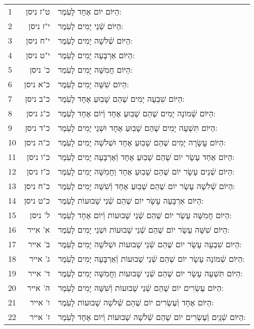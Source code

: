 \documentclass[twoside, openany, parskip=half, 11pt]{book}
\begin{document}
\begin{scriptsize}
\begin{longtable}{ l | r | p{} }
1 & ט"ז ניסן & הַיּוֹם יוֹם אֶחָד לָעֹֽמֶר: \\
2 & י"ז ניסן & הַיּוֹם שְֿׁנֵי יָמִים לָעֹֽמֶר: \\
3 & י"ח ניסן & הַיּוֹם שְֿׁלֹשָׁה יָמִים לָעֹֽמֶר: \\
4 & י"ט ניסן & הַיּוֹם אַרְבָּעָה יָמִים לָעֹֽמֶר: \\
5 & כ' ניסן & הַיּוֹם חֲמִשָּׁה יָמִים לָעֹֽמֵר: \\
6 & כ"א ניסן & הַיוֹם שִׁשָּׁה יָמִים לָעֹֽמֶר: \\
7 & כ"ב ניסן & הַיּוֹם שִׁבְעָה יָמִים שֶׁהֵם שָׁבֽוּעַ אֶחָד לָעֹֽמֶר: \\
8 & כ"ג ניסן & הַיּוֹם שְֿׁמוֹנָה יָמִים שֶׁהֵם שָׁבֽוּעַ אֶחָד וְֿיוֹם אֶחָד לָעֹֽמֶר: \\
9 & כ"ד ניסן & הַיּוֹם תִּשְׁעָה יָמִים שֶׁהֵם שָׁבֽוּעַ אֶחָד וּשְׁנֵי יָמִים לָעֹֽמֶר: \\
10 & כ"ה ניסן & הַיּוֹם עֲשָׂרָה יָמִים שֶׁהֵם שָׁבֽוּעַ אֶחָד וּשְׁלֹשָׁה יָמִים לָעֹֽמֶר: \\
11 & כ"ו ניסן & הַיּוֹם אַחַד עָשָׂר יוֹם שֶׁהֵם שָׁבֽוּעַ אֶחָד וְֿאַרְבָּעָה יָמִים לָעֹֽמֶר: \\
12 & כ"ז ניסן & הַיּוֹם שְֿׁנֵים עָשָׂר יוֹם שֶׁהֵם שָׁבֽוּעַ אֶחָד וַחֲמִשָּׁה יָמִים לָעֹֽמֶר: \\
13 & כ"ח ניסן & הַיּוֹם שְֿׁלֹשָׁה עָשָׂר יוֹם שֶׁהֵם שָׁבֽוּעַ אֶחָד וְֿשִׁשָּׁה יָמִים לָעֹֽמֶר: \\
14 & כ"ט ניסן & הַיּוֹם אַרְבָּעָה עָשָׂר יוֹם שֶׁהֵם שְֿׁנֵי שָׁבוּעוֹת לָעֹֽמֶר: \\
15 & ל' ניסן & הַיּוֹם חֲמִשָּׁה עָשָׂר יוֹם שֶׁהֵם שְֿׁנֵי שָׁבוּעוֹת וְֿיוֹם אֶחָד לָעֹֽמֶר: \\
16 & א' אייר & הַיּוֹם שִׁשָּׁה עָשָׂר יוֹם שֶׁהֵם שְֿׁנֵי שָׁבוּעוֹת וּשְׁנֵי יָמִים לָעֹֽמֶר: \\
17 & ב' אייר & הַיּוֹם שִׁבְעָה עָשָׂר יוֹם שֶׁהֵם שְֿׁנֵי שָׁבוּעוֹת וּשְׁלֹשָׁה יָמִים לָעֹֽמֶר: \\
18 & ג' אייר & הַיּוֹם שְֿׁמוֹנָה עָשָׂר יוֹם שֶׁהֵם שְֿׁנֵי שָׁבוּעוֹת וְֿאַרְבָּעָה יָמִים לָעֹֽמֶר: \\
19 & ד' אייר & הַיּוֹם תִּשְׁעָה עָשָׂר יוֹם שֶׁהֵם שְֿׁנֵי שָׁבוּעוֹת וַחֲמִשָּׁה יָמִים לָעֹֽמֶר: \\
20 & ה' אייר & הַיּוֹם עֶשְׂרִים יוֹם שֶׁהֵם שְֿׁנֵי שָׁבוּעוֹת וְֿשִׁשָּׁה יָמִים לָעֹֽמֶר: \\
21 & ו' אייר & הַיּוֹם אֶחָד וְֿעֶשְׂרִים יוֹם שֶׁהֵם שְֿׁלֹשָׁה שָׁבוּעוֹת לָעֹֽמֶר: \\
22 & ז' אייר & הַיּוֹם שְֿׁנַֽיִם וְֿעֶשְׂרִים יוֹם שֶׁהֵם שְֿׁלֹשָׁה שָׁבוּעוֹת וְֿיוֹם אֶחָד לָעֹֽמֶר: \\

\end{longtable}
\end{scriptsize}
\end{document}
